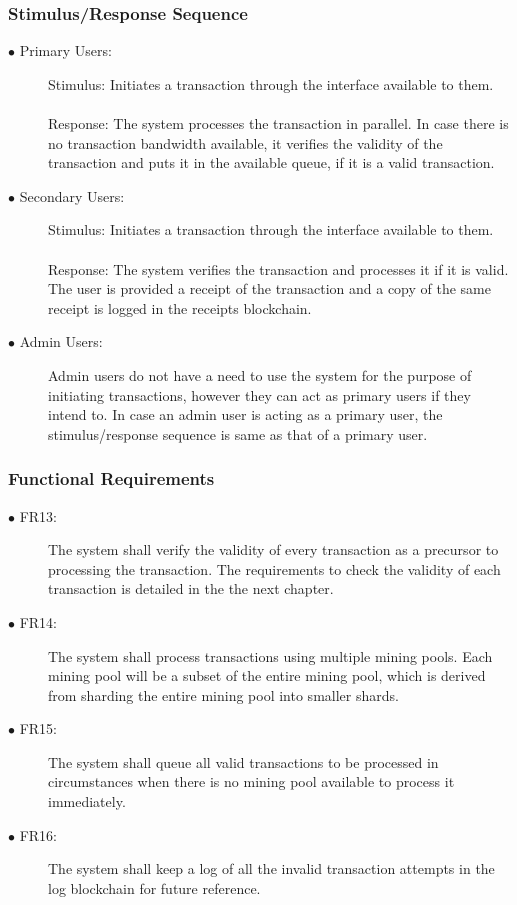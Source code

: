 \documentclass[a4paper,twoside,phd]{BYUPhys}
\begin{document}
\subsubsection{Stimulus/Response Sequence}
\begin{description}
\item[$\bullet$ Primary Users:] Stimulus: Initiates a transaction through the interface available to them.
\\
\\
Response: The system processes the transaction in parallel. In case there is no transaction bandwidth available, it verifies the validity of the transaction and puts it in the available queue, if it is a valid transaction.
\item[$\bullet$ Secondary Users:] Stimulus: Initiates a transaction through the interface available to them.
\\
\\
Response:  The system verifies the transaction and processes it if it is valid. The user is provided a receipt of the transaction and a copy of the same receipt is logged in the receipts blockchain.
\item[$\bullet$ Admin Users:] Admin users do not have a need to use the system for the purpose of initiating transactions, however they can act as primary users if they intend to. In case an admin user is acting as a primary user, the stimulus/response sequence is same as that of a primary user.
\end{description}
\subsubsection{Functional Requirements}
\begin{description}
\item[$\bullet$ FR13:] The system shall verify the validity of every transaction as a precursor to processing the transaction. The requirements to check the validity of each transaction is detailed in the the next chapter.
\item[$\bullet$ FR14:] The system shall process transactions using multiple mining pools. Each mining pool will be a subset of the entire mining pool, which is derived from sharding the entire mining pool into smaller shards.
\item[$\bullet$ FR15:] The system shall queue all valid transactions to be processed in circumstances when there is no mining pool available to process it immediately.
\item[$\bullet$ FR16:] The system shall keep a log of all the invalid transaction attempts in the log blockchain for future reference.
\end{description}
\end{document}
